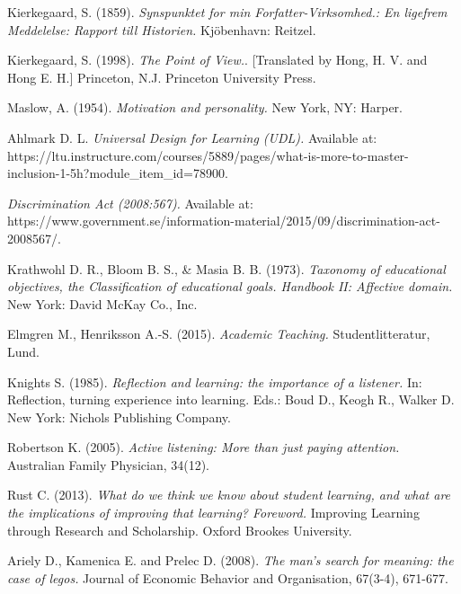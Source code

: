 \documentclass[
  a4paper, 
]{fortysecondscv}
\begin{document}
\renewcommand{\section}[2]{}
\begin{thebibliography}{9}

Kierkegaard, S. (1859).
\textit{Synspunktet for min Forfatter-Virksomhed.: En ligefrem Meddelelse: Rapport till Historien.}
Kjöbenhavn: Reitzel.
 
Kierkegaard, S. (1998).
\textit{The Point of View.}. [Translated by Hong, H. V. and Hong E. H.] 
Princeton, N.J. Princeton University Press.
 
Maslow, A. (1954).
\textit{Motivation and personality.}
New York, NY: Harper.

Ahlmark D. L.
\textit{Universal Design for Learning (UDL).}
Available at: https://ltu.instructure.com/courses/5889/pages/what-is-more-to-master-inclusion-1-5h?module\_item\_id=78900.

\textit{Discrimination Act (2008:567).}
Available at: https://www.government.se/information-material/2015/09/discrimination-act-2008567/.

Krathwohl D. R., Bloom B. S., \& Masia B. B. (1973).
\textit{Taxonomy of educational objectives, the Classification of educational goals. Handbook II: Affective domain.}
New York: David McKay Co., Inc.

Elmgren M., Henriksson A.-S. (2015).
\textit{Academic Teaching.}
Studentlitteratur, Lund.

Knights S. (1985).
\textit{Reflection and learning: the importance of a listener.}
In: Reflection, turning experience into learning. Eds.: Boud D., Keogh R., Walker D. New York: Nichols Publishing Company.

Robertson K. (2005).
\textit{Active listening: More than just paying attention.}
Australian Family Physician, 34(12).

Rust C. (2013).
\textit{What do we think we know about student learning, and what are the implications of improving that learning? Foreword.}
Improving Learning through Research and Scholarship. Oxford Brookes University. 

Ariely D.,  Kamenica E. and Prelec D. (2008).
\textit{The man’s search for meaning: the case of legos.}
Journal of Economic Behavior and Organisation, 67(3-4), 671-677.


\end{thebibliography}
\end{document}
